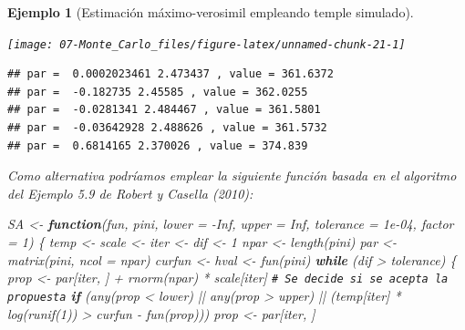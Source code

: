 \documentclass[
]{book}
\newenvironment{Shaded}{\begin{snugshade}}{\end{snugshade}}
\newcommand{\AttributeTok}[1]{\textcolor[rgb]{0.77,0.63,0.00}{#1}}
\newcommand{\CommentTok}[1]{\textcolor[rgb]{0.56,0.35,0.01}{\textit{#1}}}
\newcommand{\ConstantTok}[1]{\textcolor[rgb]{0.00,0.00,0.00}{#1}}
\newcommand{\ControlFlowTok}[1]{\textcolor[rgb]{0.13,0.29,0.53}{\textbf{#1}}}
\newcommand{\DecValTok}[1]{\textcolor[rgb]{0.00,0.00,0.81}{#1}}
\newcommand{\FloatTok}[1]{\textcolor[rgb]{0.00,0.00,0.81}{#1}}
\newcommand{\FunctionTok}[1]{\textcolor[rgb]{0.00,0.00,0.00}{#1}}
\newcommand{\NormalTok}[1]{#1}
\newcommand{\OtherTok}[1]{\textcolor[rgb]{0.56,0.35,0.01}{#1}}
\newcommand{\SpecialCharTok}[1]{\textcolor[rgb]{0.00,0.00,0.00}{#1}}
\theoremstyle{break}
\newtheorem{example}{Ejemplo}[chapter]
\theoremstyle{nonumberplain}
\renewcommand{\CommentTok}[1]{\textcolor[rgb]{0.41,0.41,0.41}{\texttt{#1}}}
\begin{document}
\begin{example}[Estimación máximo-verosimil empleando temple simulado]
\begin{center}\texttt{[image: 07-Monte\_Carlo\_files/figure-latex/unnamed-chunk-21-1]} \end{center}

\begin{verbatim}
## par =  0.0002023461 2.473437 , value = 361.6372 
## par =  -0.182735 2.45585 , value = 362.0255 
## par =  -0.0281341 2.484467 , value = 361.5801 
## par =  -0.03642928 2.488626 , value = 361.5732 
## par =  0.6814165 2.370026 , value = 374.839
\end{verbatim}

Como alternativa podríamos emplear la siguiente función basada en el algoritmo del Ejemplo 5.9 de Robert y Casella (2010):

\begin{Shaded}
\begin{Highlighting}[]
\NormalTok{SA }\OtherTok{\textless{}{-}} \ControlFlowTok{function}\NormalTok{(fun, pini, }\AttributeTok{lower =} \SpecialCharTok{{-}}\ConstantTok{Inf}\NormalTok{, }\AttributeTok{upper =} \ConstantTok{Inf}\NormalTok{, }\AttributeTok{tolerance =} \FloatTok{1e{-}04}\NormalTok{, }\AttributeTok{factor =} \DecValTok{1}\NormalTok{) \{}
\NormalTok{  temp }\OtherTok{\textless{}{-}}\NormalTok{ scale }\OtherTok{\textless{}{-}}\NormalTok{ iter }\OtherTok{\textless{}{-}}\NormalTok{ dif }\OtherTok{\textless{}{-}} \DecValTok{1}
\NormalTok{  npar }\OtherTok{\textless{}{-}} \FunctionTok{length}\NormalTok{(pini) }
\NormalTok{  par }\OtherTok{\textless{}{-}} \FunctionTok{matrix}\NormalTok{(pini, }\AttributeTok{ncol =}\NormalTok{ npar)}
\NormalTok{  curfun }\OtherTok{\textless{}{-}}\NormalTok{ hval }\OtherTok{\textless{}{-}} \FunctionTok{fun}\NormalTok{(pini)}
  \ControlFlowTok{while}\NormalTok{ (dif }\SpecialCharTok{\textgreater{}}\NormalTok{ tolerance) \{}
\NormalTok{    prop }\OtherTok{\textless{}{-}}\NormalTok{ par[iter, ] }\SpecialCharTok{+} \FunctionTok{rnorm}\NormalTok{(npar) }\SpecialCharTok{*}\NormalTok{ scale[iter]}
    \CommentTok{\# Se decide si se acepta la propuesta}
    \ControlFlowTok{if}\NormalTok{ (}\FunctionTok{any}\NormalTok{(prop }\SpecialCharTok{\textless{}}\NormalTok{ lower) }\SpecialCharTok{||} \FunctionTok{any}\NormalTok{(prop }\SpecialCharTok{\textgreater{}}\NormalTok{ upper) }\SpecialCharTok{||} 
\NormalTok{        (temp[iter] }\SpecialCharTok{*} \FunctionTok{log}\NormalTok{(}\FunctionTok{runif}\NormalTok{(}\DecValTok{1}\NormalTok{)) }\SpecialCharTok{\textgreater{}}\NormalTok{ curfun }\SpecialCharTok{{-}} \FunctionTok{fun}\NormalTok{(prop)))  prop }\OtherTok{\textless{}{-}}\NormalTok{ par[iter, ]}

\end{Highlighting}
\end{Shaded}
\end{example}
\end{document}
